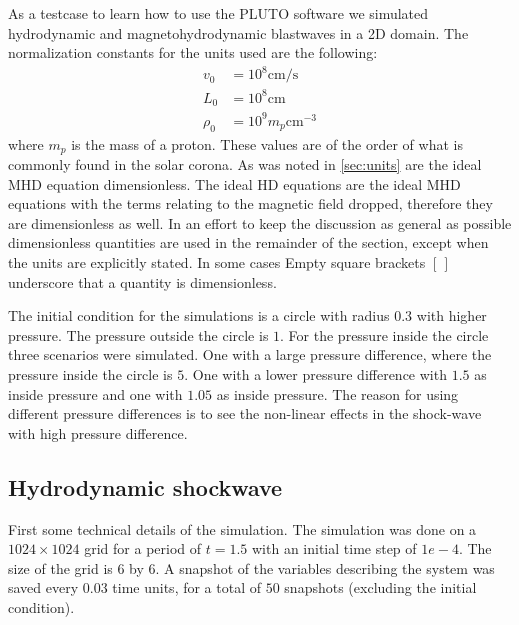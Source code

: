 As a testcase to learn how to use the PLUTO software we simulated hydrodynamic and magnetohydrodynamic blastwaves in a 2D domain.
The normalization constants for the units used are the following:
\begin{align*}
	v_0 &= 10^8 \text{cm/s}\\
	L_0 &= 10^8 \text{cm}\\
	\rho_0 &= 10^9 m_p \text{cm}^{-3}
\end{align*}
where $m_p$ is the mass of a proton. These values are of the order of what is commonly found in the solar corona. 
As was noted in \cref{sec:units} are the ideal MHD equation dimensionless.
The ideal HD equations are the ideal MHD equations with the terms relating to the magnetic field dropped, therefore they are dimensionless as well.
In an effort to keep the discussion as general as possible dimensionless quantities are used in the remainder of the section, except when the units are explicitly stated.
In some cases Empty square brackets $[\,]$ underscore that a quantity is dimensionless.

The initial condition for the simulations is a circle with radius $0.3$ with higher pressure.
The pressure outside the circle is $1$. For the pressure inside the circle three scenarios were simulated.
One with a large pressure difference, where the pressure inside the circle is $5$. One with a lower pressure difference with $1.5$ as inside pressure and one with $1.05$ as inside pressure.
The reason for using different pressure differences is to see the non-linear effects in the shock-wave with high pressure difference.

\subsection{Hydrodynamic shockwave}
First some technical details of the simulation.
The simulation was done on a $1024 \times 1024$ grid for a period of $t=1.5$ with an initial time step of $1e-4$.
The size of the grid is $6$ by $6$.
A snapshot of the variables describing the system was saved every $0.03$ time units, for a total of $50$ snapshots (excluding the initial condition).

